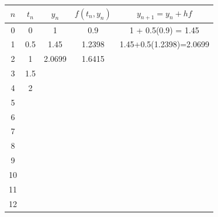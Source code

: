 \documentclass[convert]{standalone}
\begin{document}
\begin{tabular}{|c|c|c|c|c|}
	\hline
	$n$ & $t_n$ & $y_n$  & $f(t_n,y_n)$ & $y_{n+1}=y_n + hf$      \\ \hline
	0   & 0     & 1      & 0.9          & 1 + 0.5(0.9) = 1.45     \\ \hline
	1   & 0.5   & 1.45   & 1.2398       & 1.45+0.5(1.2398)=2.0699 \\ \hline
	2   & 1     & 2.0699 & 1.6415       &                         \\ \hline
	3   & 1.5   &        &              &                         \\ \hline
	4   & 2     &        &              &                         \\ \hline
	5   &       &        &              &                         \\ \hline
	6   &       &        &              &                         \\ \hline
	7   &       &        &              &                         \\ \hline
	8   &       &        &              &                         \\ \hline
	9   &       &        &              &                         \\ \hline
	10  &       &        &              &                         \\ \hline
	11  &       &        &              &                         \\ \hline
	12  &       &        &              &                         \\ \hline
\end{tabular}
\end{document}
